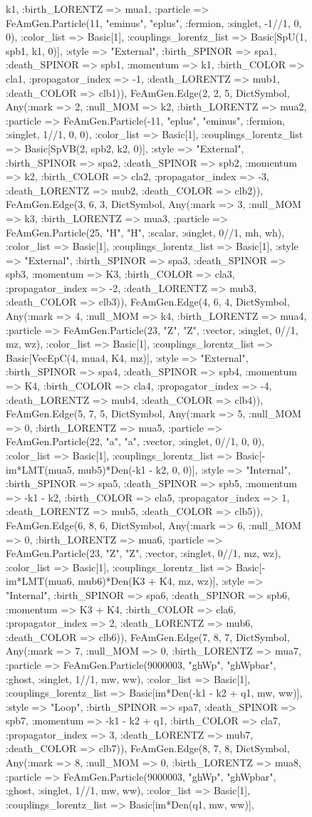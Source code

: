 \documentclass{revtex4}
\begin{document}
\begin{figure}[!htb]
\begin{center}
{k1, :birth_LORENTZ => mua1, :particle => FeAmGen.Particle(11, "eminus", "eplus", :fermion, :singlet, -1//1, 0, 0), :color_list => Basic[1], :couplings_lorentz_list => Basic[SpU(1, spb1, k1, 0)], :style => "External", :birth_SPINOR => spa1, :death_SPINOR => spb1, :momentum => k1, :birth_COLOR => cla1, :propagator_index => -1, :death_LORENTZ => mub1, :death_COLOR => clb1)), FeAmGen.Edge(2, 2, 5, Dict{Symbol, Any}(:mark => 2, :null_MOM => k2, :birth_LORENTZ => mua2, :particle => FeAmGen.Particle(-11, "eplus", "eminus", :fermion, :singlet, 1//1, 0, 0), :color_list => Basic[1], :couplings_lorentz_list => Basic[SpVB(2, spb2, k2, 0)], :style => "External", :birth_SPINOR => spa2, :death_SPINOR => spb2, :momentum => k2, :birth_COLOR => cla2, :propagator_index => -3, :death_LORENTZ => mub2, :death_COLOR => clb2)), FeAmGen.Edge(3, 6, 3, Dict{Symbol, Any}(:mark => 3, :null_MOM => k3, :birth_LORENTZ => mua3, :particle => FeAmGen.Particle(25, "H", "H", :scalar, :singlet, 0//1, mh, wh), :color_list => Basic[1], :couplings_lorentz_list => Basic[1], :style => "External", :birth_SPINOR => spa3, :death_SPINOR => spb3, :momentum => K3, :birth_COLOR => cla3, :propagator_index => -2, :death_LORENTZ => mub3, :death_COLOR => clb3)), FeAmGen.Edge(4, 6, 4, Dict{Symbol, Any}(:mark => 4, :null_MOM => k4, :birth_LORENTZ => mua4, :particle => FeAmGen.Particle(23, "Z", "Z", :vector, :singlet, 0//1, mz, wz), :color_list => Basic[1], :couplings_lorentz_list => Basic[VecEpC(4, mua4, K4, mz)], :style => "External", :birth_SPINOR => spa4, :death_SPINOR => spb4, :momentum => K4, :birth_COLOR => cla4, :propagator_index => -4, :death_LORENTZ => mub4, :death_COLOR => clb4)), FeAmGen.Edge(5, 7, 5, Dict{Symbol, Any}(:mark => 5, :null_MOM => 0, :birth_LORENTZ => mua5, :particle => FeAmGen.Particle(22, "a", "a", :vector, :singlet, 0//1, 0, 0), :color_list => Basic[1], :couplings_lorentz_list => Basic[-im*LMT(mua5, mub5)*Den(-k1 - k2, 0, 0)], :style => "Internal", :birth_SPINOR => spa5, :death_SPINOR => spb5, :momentum => -k1 - k2, :birth_COLOR => cla5, :propagator_index => 1, :death_LORENTZ => mub5, :death_COLOR => clb5)), FeAmGen.Edge(6, 8, 6, Dict{Symbol, Any}(:mark => 6, :null_MOM => 0, :birth_LORENTZ => mua6, :particle => FeAmGen.Particle(23, "Z", "Z", :vector, :singlet, 0//1, mz, wz), :color_list => Basic[1], :couplings_lorentz_list => Basic[-im*LMT(mua6, mub6)*Den(K3 + K4, mz, wz)], :style => "Internal", :birth_SPINOR => spa6, :death_SPINOR => spb6, :momentum => K3 + K4, :birth_COLOR => cla6, :propagator_index => 2, :death_LORENTZ => mub6, :death_COLOR => clb6)), FeAmGen.Edge(7, 8, 7, Dict{Symbol, Any}(:mark => 7, :null_MOM => 0, :birth_LORENTZ => mua7, :particle => FeAmGen.Particle(9000003, "ghWp", "ghWpbar", :ghost, :singlet, 1//1, mw, ww), :color_list => Basic[1], :couplings_lorentz_list => Basic[im*Den(-k1 - k2 + q1, mw, ww)], :style => "Loop", :birth_SPINOR => spa7, :death_SPINOR => spb7, :momentum => -k1 - k2 + q1, :birth_COLOR => cla7, :propagator_index => 3, :death_LORENTZ => mub7, :death_COLOR => clb7)), FeAmGen.Edge(8, 7, 8, Dict{Symbol, Any}(:mark => 8, :null_MOM => 0, :birth_LORENTZ => mua8, :particle => FeAmGen.Particle(9000003, "ghWp", "ghWpbar", :ghost, :singlet, 1//1, mw, ww), :color_list => Basic[1], :couplings_lorentz_list => Basic[im*Den(q1, mw, ww)], }
\end{center}
\end{figure}
\end{document}

